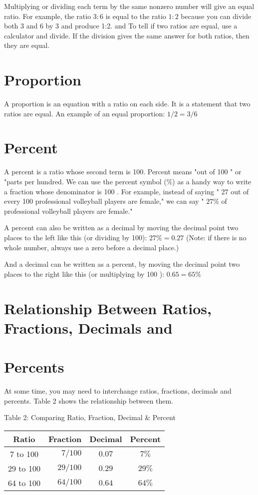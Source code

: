 \begin{enumerate}
Multiplying or dividing each term by the same nonzero number will give an equal ratio. For example, the ratio $3: 6$ is equal to the ratio $1: 2$ because you can divide both 3 and 6 by 3 and produce 1:2. and To tell if two ratios are equal, use a calculator and divide. If the division gives the same answer for both ratios, then they are equal.

\section{Proportion}
A proportion is an equation with a ratio on each side. It is a statement that two ratios are equal. An example of an equal proportion: $1 / 2=3 / 6$

\section{Percent}
A percent is a ratio whose second term is 100. Percent means "out of 100 " or "parts per hundred. We can use the percent symbol (\%) as a handy way to write a fraction whose denominator is 100 . For example, instead of saying " 27 out of every 100 professional volleyball players are female," we can say " $27 \%$ of professional volleyball players are female."

A percent can also be written as a decimal by moving the decimal point two places to the left like this (or dividing by 100): $27 \%=0.27$ (Note: if there is no whole number, always use a zero before a decimal place.)

And a decimal can be written as a percent, by moving the decimal point two places to the right like this (or multiplying by 100 ): $0.65=65 \%$

\section{Relationship Between Ratios, Fractions, Decimals and}
\section{Percents}
At some time, you may need to interchange ratios, fractions, decimals and percents. Table 2 shows the relationship between them.

Table 2: Comparing Ratio, Fraction, Decimal \& Percent

\begin{tabular}{|c|r|c|c|}
\hline
Ratio & Fraction & Decimal & Percent \\
\hline
7 to 100 & $7 / 100$ & $0.07$ & $7 \%$ \\
\hline
29 to 100 & $29 / 100$ & $0.29$ & $29 \%$ \\
\hline
64 to 100 & $64 / 100$ & $0.64$ & $64 \%$ \\
\hline
\end{tabular}


\end{enumerate}
